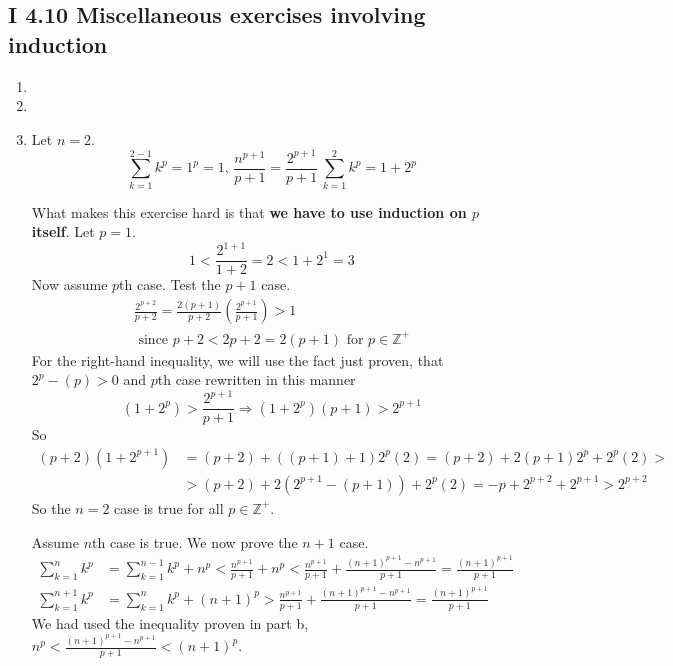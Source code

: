 \documentclass[twoside]{amsart}
\theoremstyle{plain}
\theoremstyle{definition}
\newcommand{\exercisehead}[1]
  {\smallskip
   \noindent{\small\bf Exercise #1.}}
\begin{document}
\subsection*{ I 4.10 Miscellaneous exercises involving induction }

\exercisehead{13}\begin{enumerate}
\item
\item 
\item Let $n=2$.  
\[
\sum_{k=1}^{2-1} k^p = 1^p = 1, \, \frac{ n^{p+1}}{ p+1} = \frac{ 2^{p+1} }{ p+1 }\, \sum_{k=1}^2 k^p = 1+2^p
\]

What makes this exercise hard is that \textbf{ we have to use induction on $p$ itself}.  Let $p=1$.  
\[
1 < \frac{ 2^{1+1}}{ 1+2} = 2 < 1+2^1 = 3 
\]
Now assume $p$th case.  Test the $p+1$ case.  
\[
\begin{gathered}
  \frac{ 2^{p+2}}{ p+2} = \frac{ 2(p+1)}{ p+2} \left( \frac{ 2^{p+1}}{ p+1} \right) > 1 \\
  \text{ since } p+2 < 2p+2 = 2(p+1) \text{ for } p \in \mathbb{Z}^+
\end{gathered}
\]
For the right-hand inequality, we will use the fact just proven, that $2^{p} - (p) > 0 $ and $p$th case rewritten in this manner
\[
(1+2^p) > \frac{ 2^{p+1}}{ p+1} \Longrightarrow (1+2^p)(p+1) > 2^{p+1}
\]
So  
\[
\begin{aligned}
  (p+2)(1+2^{p+1}) & = (p+2) + ((p+1) + 1)2^p (2) = (p+2)+ 2(p+1) 2^p + 2^p (2) > \\
  & > (p+2) + 2 (2^{p+1} - (p+1)) + 2^p (2) = -p + 2^{p+2} + 2^{p+1} > 2^{p+2}
\end{aligned}
\]
So the $n=2$ case is true for all $p \in \mathbb{Z}^+$.  

Assume $n$th case is true.  We now prove the $n+1$ case.
\[
\begin{aligned}
  \sum_{k=1}^n k^p & = \sum_{k=1}^{n-1} k^p + n^p < \frac{n^{p+1}}{ p+1} + n^p < \frac{ n^{p+1}}{p+1} + \frac{ (n+1)^{p+1} -n^{p+1}}{ p+1} = \frac{ (n+1)^{p+1}}{ p+1} \\
  \sum_{k=1}^{n+1} k^p & = \sum_{k=1}^n k^p + (n+1)^p > \frac{ n^{p+1}}{p+1} + \frac{ (n+1)^{p+1} -n^{p+1}}{ p+1} = \frac{ (n+1)^{p+1}}{ p+1}
\end{aligned}
\]
We had used the inequality proven in part b, $ n^p < \frac{ (n+1)^{p+1} - n^{p+1} }{ p+1} < (n+1)^p$.  
\end{enumerate}
\end{document}
